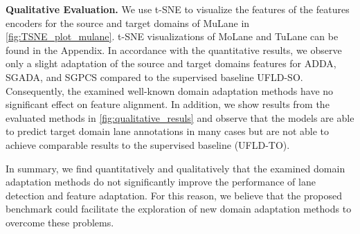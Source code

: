 \documentclass{article}
\begin{document}
	
	\textbf{Qualitative Evaluation.}
	We use t-SNE \cite{van2008visualizing} to visualize the features of the features encoders for the source and target domains of MuLane in \autoref{fig:TSNE_plot_mulane}. t-SNE visualizations of MoLane and TuLane can be found in the Appendix. In accordance with the quantitative results, we observe only a slight adaptation of the source and target domains features for ADDA, SGADA, and SGPCS compared to the supervised baseline UFLD-SO. Consequently, the examined well-known domain adaptation methods have no significant effect on feature alignment. In addition, we show results from the evaluated methods in \autoref{fig:qualitative_resuls} and observe that the models are able to predict target domain lane annotations in many cases but are not able to achieve comparable results to the supervised baseline (UFLD-TO).
	
	In summary, we find quantitatively and qualitatively that the examined domain adaptation methods do not significantly improve the performance of lane detection and feature adaptation. For this reason, we believe that the proposed benchmark could facilitate the exploration of new domain adaptation methods to overcome these problems. 
	
\end{document}
